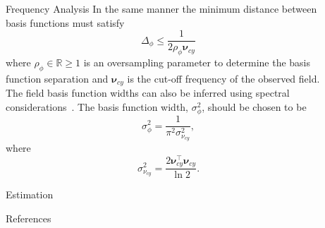 \documentclass[final]{beamer}
\newlength{\sepwid}
\newlength{\onecolwid}
\begin{document}
\begin{frame}[t]
\begin{columns}[t]
\begin{column}{\onecolwid}
\begin{block}{Frequency Analysis}
{		In the same manner the minimum distance between basis functions must satisfy 
		\begin{equation}\label{eq:BasisFunctionSeparation}
			\Delta_{\phi} \leq \frac{1}{2\rho_{\phi}\boldsymbol{\nu}_{cy}}
		\end{equation}
		where $\rho_{\phi} \in \mathbb{R} \ge 1$ is an oversampling parameter to determine the basis function separation and $\boldsymbol{\nu}_{cy}$ is the cut-off frequency of the observed field.
		The field basis function widths can also be inferred using spectral considerations~\cite{Scerri2009}. The basis function width, $\sigma^2_{\phi}$, should be chosen to be
		\begin{equation}\label{eq:WidthCutOffRelationship}
		 \sigma^2_{\phi}= \frac{1}{\pi^2\sigma_{\nu_{cy}}^2},
		\end{equation}
		where
		\begin{equation}\label{eq:WidthFrequencyRelationship}
		 \sigma^2_{\nu_{cy}}= \frac{2\boldsymbol\nu_{cy}^\top \boldsymbol\nu_{cy}}{\ln2}.
		\end{equation}}
	\end{block}
	\begin{block}{Estimation}
	\end{block}	
	\begin{block}{References}
        \small{}	\end{block}
\end{column}

  \begin{column}{\sepwid}\end{column}			%
	\begin{column}{\onecolwid}	


\end{column}
\end{columns}
\end{frame}
\end{document}
